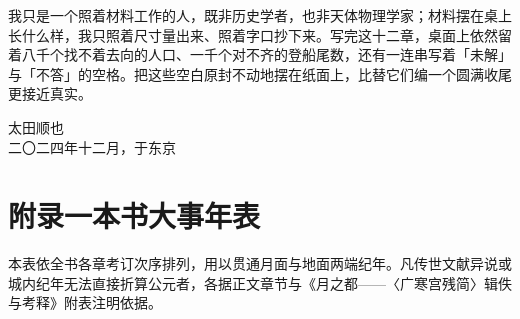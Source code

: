 我只是一个照着材料工作的人，既非历史学者，也非天体物理学家；材料摆在桌上长什么样，我只照着尺寸量出来、照着字口抄下来。写完这十二章，桌面上依然留着八千个找不着去向的人口、一千个对不齐的登船尾数，还有一连串写着「未解」与「不答」的空格。把这些空白原封不动地摆在纸面上，比替它们编一个圆满收尾更接近真实。

\begin{flushright}
{\small 太田顺也}\\[2mm]
{\footnotesize\color{pencil} 二〇二四年十二月，于东京}
\end{flushright}

\clearpage
\chapter*{附录一\quad 本书大事年表}
{}

本表依全书各章考订次序排列，用以贯通月面与地面两端纪年。凡传世文献异说或城内纪年无法直接折算公元者，各据正文章节与《月之都——〈广寒宫残简〉辑佚与考释》附表注明依据。

